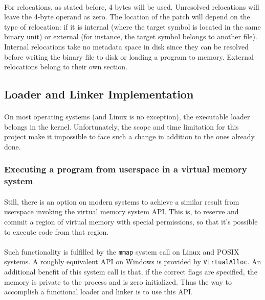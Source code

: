 \documentclass[12pt]{article}
\begin{document}
	\paragraph{}For relocations, as stated before, 4 bytes will be used. Unresolved relocations will leave the 4-byte operand as zero. The location of the patch will depend on the type of relocation: if it is internal (where the target symbol is located in the same binary unit) or external (for instance, the target symbol belongs to another file). Internal relocations take no metadata space in disk since they can be resolved before writing the binary file to disk or loading a program to memory. External relocations belong to their own section.
	
	\subsection{Loader and Linker Implementation}
	
	\paragraph{} On most operating systems (and Linux is no exception), the executable loader belongs in the kernel. Unfortunately, the scope and time limitation for this project make it impossible to face such a 
	change in addition to the ones already done.
	
	\subsubsection{Executing a program from userspace in a virtual memory system}
	\paragraph{}Still, there is an option on modern systems to achieve a similar result from userspace invoking the virtual memory system \acrshort{API}. This is, to reserve and commit a region of virtual memory with special permissions, so that it's possible to execute code from that region.
	\paragraph{}Such functionality is fulfilled by the \verb|mmap| system call on Linux\cite{mmap} and POSIX systems. A roughly equivalent \acrshort{API} on Windows is provided by \verb|VirtualAlloc|\cite{virtual-alloc}. An additional benefit of this system call is that, if the correct flags are specified, the memory is private to the process and is zero initialized. Thus the way to accomplish a functional loader and linker is to use this \acrshort{API}.
\end{document}
